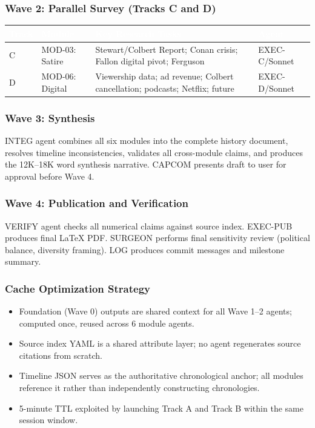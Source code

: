 \documentclass[11pt,letterpaper]{article}
\newcommand{\tableheader}[1]{\textbf{\sffamily\textcolor{white}{#1}}}
\begin{document}
\subsubsection{Wave 2: Parallel Survey (Tracks C and D)}

\begin{center}
\begin{tabularx}{\textwidth}{L{1.5cm}L{2cm}XC{2cm}}
\toprule
{}
\tableheader{Track} & \tableheader{Module} & \tableheader{Key Research Tasks} & \tableheader{Agent} \\
\midrule
C & MOD-03: Satire & Stewart/Colbert Report; Conan crisis; Fallon digital pivot; Ferguson & EXEC-C/Sonnet \\
D & MOD-06: Digital & Viewership data; ad revenue; Colbert cancellation; podcasts; Netflix; future & EXEC-D/Sonnet \\
\bottomrule
\end{tabularx}
\end{center}

\subsubsection{Wave 3: Synthesis}

INTEG agent combines all six modules into the complete history document, resolves timeline inconsistencies, validates all cross-module claims, and produces the 12K--18K word synthesis narrative. CAPCOM presents draft to user for approval before Wave 4.

\subsubsection{Wave 4: Publication and Verification}

VERIFY agent checks all numerical claims against source index. EXEC-PUB produces final LaTeX PDF. SURGEON performs final sensitivity review (political balance, diversity framing). LOG produces commit messages and milestone summary.

\subsubsection{Cache Optimization Strategy}
\begin{itemize}[leftmargin=1.5em]
  \item Foundation (Wave 0) outputs are shared context for all Wave 1--2 agents; computed once, reused across 6 module agents.
  \item Source index YAML is a shared attribute layer; no agent regenerates source citations from scratch.
  \item Timeline JSON serves as the authoritative chronological anchor; all modules reference it rather than independently constructing chronologies.
  \item 5-minute TTL exploited by launching Track A and Track B within the same session window.
\end{itemize}
\end{document}
